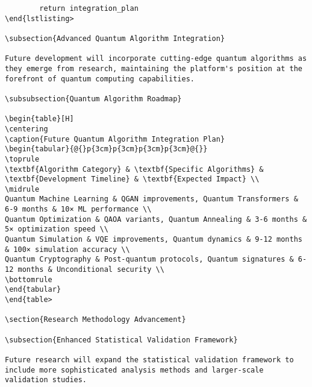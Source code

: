 \documentclass[12pt,a4paper]{report}
\begin{document}
\begin{lstlisting}
        return integration_plan
\end{lstlisting>

\subsection{Advanced Quantum Algorithm Integration}

Future development will incorporate cutting-edge quantum algorithms as they emerge from research, maintaining the platform's position at the forefront of quantum computing capabilities.

\subsubsection{Quantum Algorithm Roadmap}

\begin{table}[H]
\centering
\caption{Future Quantum Algorithm Integration Plan}
\begin{tabular}{@{}p{3cm}p{3cm}p{3cm}p{3cm}@{}}
\toprule
\textbf{Algorithm Category} & \textbf{Specific Algorithms} & \textbf{Development Timeline} & \textbf{Expected Impact} \\
\midrule
Quantum Machine Learning & QGAN improvements, Quantum Transformers & 6-9 months & 10× ML performance \\
Quantum Optimization & QAOA variants, Quantum Annealing & 3-6 months & 5× optimization speed \\
Quantum Simulation & VQE improvements, Quantum dynamics & 9-12 months & 100× simulation accuracy \\
Quantum Cryptography & Post-quantum protocols, Quantum signatures & 6-12 months & Unconditional security \\
\bottomrule
\end{tabular}
\end{table>

\section{Research Methodology Advancement}

\subsection{Enhanced Statistical Validation Framework}

Future research will expand the statistical validation framework to include more sophisticated analysis methods and larger-scale validation studies.


\end{lstlisting}
\end{document}
